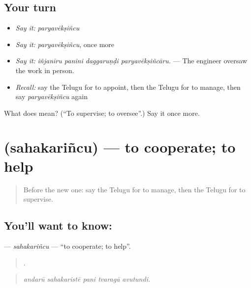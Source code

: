 \subsection*{Your turn}
\begin{itemize}
\raggedright
  \item \emph{Say it:} \emph{paryavēkṣiñcu}
  \item \emph{Say it:} \emph{paryavēkṣiñcu}, once more
  \item \emph{Say it:} \emph{iñjanīru panini daggaruṇḍi paryavēkṣiñcāru.} — The engineer oversaw the work in person.
  \item \emph{Recall:} say the Telugu for to appoint, then the Telugu for to manage, then say \emph{paryavēkṣiñcu} again
\end{itemize}

\begin{tcolorbox}[breakable,colback=teal!4,colframe=teal!35!black,title={Before you move on}]
What does  mean? (\textquotedblleft{}To supervise; to oversee\textquotedblright{}.) Say it once more.
\end{tcolorbox}
\section[\texorpdfstring{\te{సహకరించు} (sahakariñcu)}{సహకరించు (sahakariñcu)}]{ (sahakariñcu) — to cooperate; to help}

\label{lesson:TE-C526-sahakarincu}



\begin{quote}
Before the new one: say the Telugu for to manage, then the Telugu for to supervise.
\end{quote}

\subsection*{You'll want to know: }
\textbf{} — \emph{sahakariñcu} — \textquotedblleft{}to cooperate; to help\textquotedblright{}.

\begin{quote}
    .
\end{quote}

\begin{quote}
\emph{andarū sahakaristē pani tvaragā avutundi.}
\end{quote}

